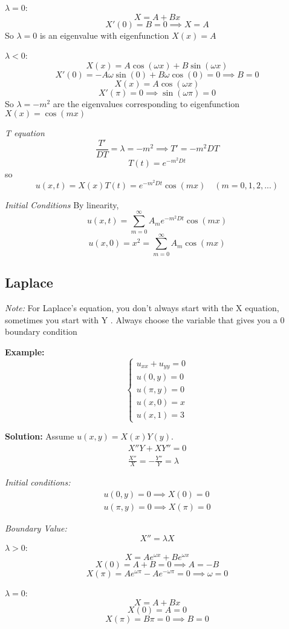 \documentclass[12pt]{article}
\begin{document}
$\lambda = 0$:
\[X = A + Bx\]
\[X'(0) = B =0 \implies X = A\]
So $\lambda = 0$ is an eigenvalue with eigenfunction $X(x) =A$

$\lambda < 0$:
\[X(x) = A\cos(\omega x) + B\sin(\omega x)\]
\[X'(0) = -A\omega \sin(0) + B\omega \cos(0) = 0 \implies B =0\]
\[X(x) = A\cos(\omega x)\]
\[X'(\pi) = 0 \implies \sin(\omega \pi) = 0\]
So $\lambda = -m^2$ are the eigenvalues corresponding to eigenfunction $X(x) = \cos(mx)$

\emph{T equation}
\[\frac{T'}{DT} = \lambda = -m^2 \implies T' = -m^2DT\]
\[T(t) = e^{-m^2Dt}\]
so 
\[u(x, t) = X(x)T(t) = e^{-m^2Dt}\cos(mx) \quad (m= 0, 1,2, ...)\]

\emph{Initial Conditions}
By linearity,
\[u(x, t) = \sum_{m=0}^\infty A_me^{-m^2Dt}\cos(mx)\]
\[u(x, 0) = \boxed{x^2 = \sum_{m=0}^\infty A_m \cos(mx)}\]

\subsection{Laplace}
\emph{Note:} For Laplace's equation, you don't always start with the X equation, sometimes you start with Y . Always choose the variable that gives you a 0 boundary condition

\textbf{Example:}
\[\begin{cases}
    u_{xx} + u_{yy} = 0\\
    u(0, y) = 0\\
    u(\pi, y) = 0\\
    u(x, 0) = x\\
    u(x, 1) = 3
\end{cases}\]

\textbf{Solution:}
Assume $u(x, y) = X(x)Y(y)$. 
\begin{gather*}
    X''Y + XY'' = 0\\
    \frac{X''}{X} = -\frac{Y''}{Y} = \lambda
\end{gather*}

\emph{Initial conditions:}
\begin{gather*}
    u(0, y) = 0 \implies X(0) = 0\\
    u(\pi, y) = 0 \implies X(\pi) = 0
\end{gather*}

\emph{Boundary Value:}
\[X'' = \lambda X\]
$\lambda > 0$: 
\[X = Ae^{\omega x} + Be^{\omega x}\]
\[X(0) = A + B = 0 \implies A = -B\]
\[X(\pi) = Ae^{\omega \pi} - Ae^{-\omega \pi} = 0 \implies \omega = 0\]

$\lambda = 0$:
\[X = A + Bx\]
\[X(0) = A = 0\]
\[X(\pi) = B\pi = 0 \implies B =0\]
\end{document}
